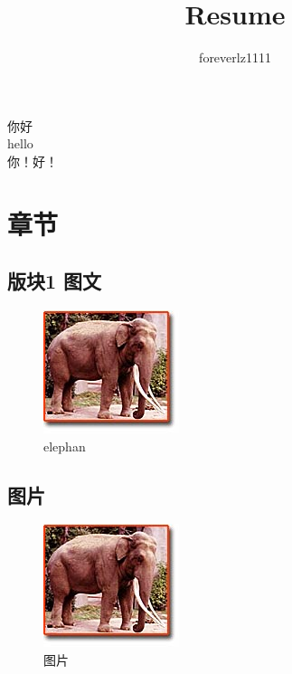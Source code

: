 \documentclass[a4paper,12pt,landscape]{book}
\begin{document}
	\title{{\large \textbf{Resume}}}
	\author{foreverlz1111}
	\date{}
	\maketitle
	你好 \\
	hello \\
	你！好！ \\
	\tableofcontents 
	
	
	\setcounter{page}{3}
	
	\fancyhf{}
	\renewcommand{\headrulewidth}{2pt}
	\renewcommand{\footrulewidth}{1pt}
	
	\chapter{章节}
	\blindmathtrue
	\blindtext[5]
	\section{版块1 图文}
	\blindtext
	\begin{figure}[ht]
		\centering
		\includegraphics{elephantbig.jpg}\caption{elephan}\label{pic:elephan}
	\end{figure}
	\blindtext
	\newpage
	\section*{图片}
	\begingroup
	\setlength{\columnsep}{15pt}
	\begin{figure}
		\centering
		\includegraphics{elephantbig.jpg}
		\caption{图片}\label{fig:prettypic}
	\end{figure}
	\blindtext
	
\end{document}
